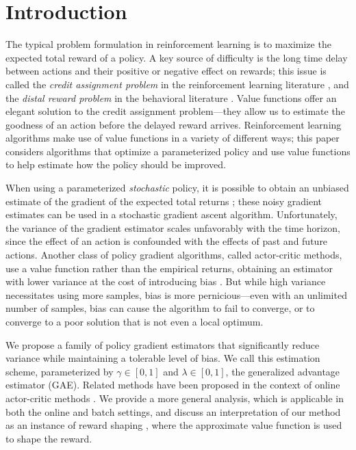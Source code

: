\documentclass{article}
\begin{document}
\section{Introduction}

The typical problem formulation in reinforcement learning is to maximize the expected total reward of a policy.
A key source of difficulty is the long time delay between actions and their positive or negative effect on rewards;
this issue is called the \textit{credit assignment problem} in the reinforcement learning literature \citep{minsky1961steps,sutton1998introduction}, and the \textit{distal reward problem} in the behavioral literature \citep{hull1943principles}.
Value functions offer an elegant solution to the credit assignment problem---they allow us to estimate the goodness of an action before the delayed reward arrives.
Reinforcement learning algorithms make use of value functions in a variety of different ways; this paper considers algorithms that optimize a parameterized policy and use value functions to help estimate how the policy should be improved.




When using a parameterized \textit{stochastic} policy, it is possible to obtain an unbiased estimate of the gradient of the expected total returns \citep{williams1992simple,sutton1999policy,baxter2000reinforcement}; these noisy gradient estimates can be used in a stochastic gradient ascent algorithm.
Unfortunately, the variance of the gradient estimator scales unfavorably with the time horizon, since the effect of an action is confounded with the effects of past and future actions.
Another class of policy gradient algorithms, called actor-critic methods, use a value function rather than the empirical returns, obtaining an estimator with lower variance at the cost of introducing bias \citep{konda2003onactor,hafner2011reinforcement}.
But while high variance necessitates using more samples,
bias is more pernicious---even with an unlimited number of samples, bias can cause the algorithm to fail to converge, or to converge to a poor solution that is not even a local optimum.

We propose a family of policy gradient estimators that significantly reduce variance while maintaining a tolerable level of bias.
We call this estimation scheme, parameterized by $\gamma \in [0,1]$ and $\lambda \in [0,1]$, the generalized advantage estimator (GAE).
Related methods have been proposed in the context of online actor-critic methods \citep{kimura1998analysis,wawrzynski2009real}. We provide a more general analysis, which is applicable in both the online and batch settings, and discuss an interpretation of our method as an instance of reward shaping \citep{ng1999policy}, where the approximate value function is used to shape the reward.
\end{document}
